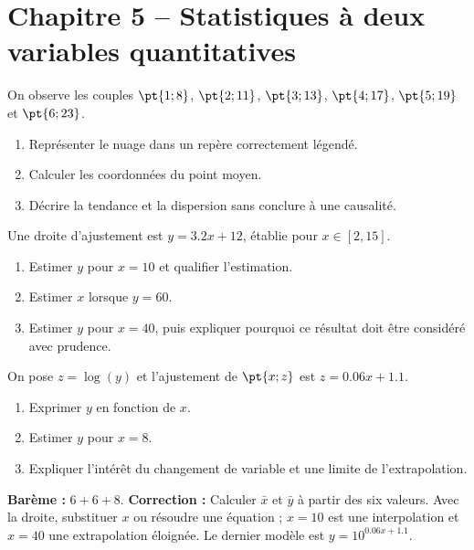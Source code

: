 \section*{Chapitre 5 -- Statistiques à deux variables quantitatives}
\begin{exercise}
On observe les couples $\pt{1;8}$, $\pt{2;11}$, $\pt{3;13}$, $\pt{4;17}$, $\pt{5;19}$ et $\pt{6;23}$.
\begin{enumerate}
\item Représenter le nuage dans un repère correctement légendé.
\item Calculer les coordonnées du point moyen.
\item Décrire la tendance et la dispersion sans conclure à une causalité.
\end{enumerate}
\end{exercise}
\begin{exercise}
Une droite d'ajustement est $y=\num{3,2}x+12$, établie pour $x\in[2,15]$.
\begin{enumerate}
\item Estimer $y$ pour $x=10$ et qualifier l'estimation.
\item Estimer $x$ lorsque $y=60$.
\item Estimer $y$ pour $x=40$, puis expliquer pourquoi ce résultat doit être considéré avec prudence.
\end{enumerate}
\end{exercise}
\begin{exercise}
On pose $z=\log(y)$ et l'ajustement de $\pt{x;z}$ est $z=\num{0,06}x+\num{1,1}$.
\begin{enumerate}
\item Exprimer $y$ en fonction de $x$.
\item Estimer $y$ pour $x=8$.
\item Expliquer l'intérêt du changement de variable et une limite de l'extrapolation.
\end{enumerate}
\end{exercise}
\begin{solution}\textbf{Barème :} $6+6+8$. \textbf{Correction :} Calculer $\bar x$ et $\bar y$ à partir des six valeurs. Avec la droite, substituer $x$ ou résoudre une équation ; $x=10$ est une interpolation et $x=40$ une extrapolation éloignée. Le dernier modèle est $y=10^{\num{0,06}x+\num{1,1}}$.\end{solution}

